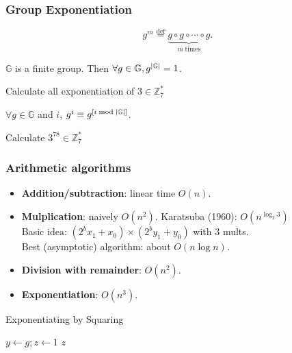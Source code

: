 \begin{frame}\frametitle{Group Exponentiation}
\[ g^m \overset{\text{def}}{=} \underbrace{g\circ g\circ \cdots \circ g}_{m\; \text{times}}. \]
\begin{theorem}
$\mathbb{G}$ is a finite group. Then $\forall g \in \mathbb{G}, g^{\lvert\mathbb{G}\rvert}=1$.
\end{theorem}
\begin{exampleblock}{Calculate all exponentiation of $3 \in \mathbb{Z}_{7}^*$}
\end{exampleblock}
\begin{corollary}
$\forall g \in \mathbb{G}$ and $i$, $g^i \equiv g^{[i \bmod {\lvert\mathbb{G}\rvert}]}$.
\end{corollary}
\begin{exampleblock}{Calculate $3^{78} \in \mathbb{Z}_{7}^*$}
\end{exampleblock}
\end{frame}
\begin{frame}\frametitle{Arithmetic algorithms}
\begin{itemize}
\item \textbf{Addition/subtraction}: linear time $O(n)$.
\item \textbf{Mulplication}: naively $O(n^2)$. Karatsuba (1960): $O(n^{\log_2 3})$\\
Basic idea: $(2^bx_1+x_0) \times (2^by_1+ y_0)$ with 3 mults.\\
Best (asymptotic) algorithm: about $O(n\log n)$.
\item \textbf{Division with remainder}: $O(n^2)$.
\item \textbf{Exponentiation}: $O(n^3)$.
\end{itemize}
\begin{algorithm}[H]
\DontPrintSemicolon
\caption{Exponentiating by Squaring}
\BlankLine
$y \gets g; z \gets 1$\;
\Return $z$
\end{algorithm}
\end{frame}
